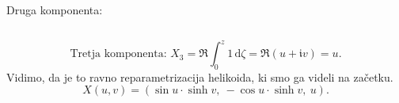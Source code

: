\documentclass[8pt]{beamer}
\theoremstyle{definition}
\theoremstyle{remark}
\theoremstyle{plain}
\numberwithin{equation}{section}  %
\begin{document}
\begin{frame}
\begin{columns}
        \begin{column}{0.475\textwidth}
            Druga komponenta:
        \end{column}
    \end{columns}
    \begin{equation*}
        \text{Tretja komponenta: } X_3=\Re \int_0^z 1 \, \mathrm{d}\zeta = \Re \left(u + \mathfrak{i}v\right) = u.
    \end{equation*}
    Vidimo, da je to ravno reparametrizacija helikoida, ki smo ga videli na začetku. 
    \begin{equation*}
        X(u, v) = \left( \sin u \cdot \sinh v,\ -\cos u \cdot \sinh v,\ u \right).
    \end{equation*}
    
\end{frame}
\end{document}
